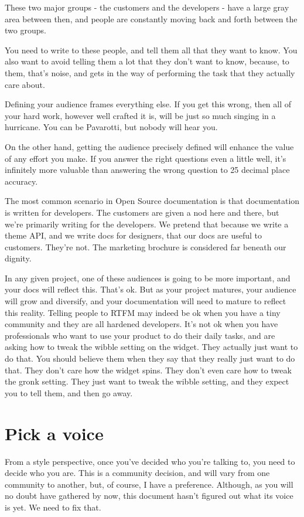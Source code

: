 These two major groups - the customers and the developers - have a large
gray area between then, and people are constantly moving back and forth
between the two groups.

You need to write to these people, and tell them all that they want to
know. You also want to avoid telling them a lot that they don't want to
know, because, to them, that's noise, and gets in the way of performing
the task that they actually care about.

Defining your audience frames everything else. If you get this wrong,
then all of your hard work, however well crafted it is, will be just so
much singing in a hurricane. You can be Pavarotti, but nobody will hear
you.

On the other hand, getting the audience precisely defined will enhance
the value of any effort you make. If you answer the right questions even
a little well, it's infinitely more valuable than answering the wrong
question to 25 decimal place accuracy.

The most common scenario in Open Source documentation is that
documentation is written for developers. The customers are given a nod
here and there, but we're primarily writing for the developers. We
pretend that because we write a theme API, and we write docs for
designers, that our docs are useful to customers. They're not. The
marketing brochure is considered far beneath our dignity.

In any given project, one of these audiences is going to be more
important, and your docs will reflect this. That's ok. But as your
project matures, your audience will grow and diversify, and your
documentation will need to mature to reflect this reality. Telling
people to RTFM may indeed be ok when you have a tiny community and they
are all hardened developers. It's not ok when you have professionals who
want to use your product to do their daily tasks, and are asking how to
tweak the wibble setting on the widget. They actually just want to do
that. You should believe them when they say that they really just want
to do that. They don't care how the widget spins. They don't even care
how to tweak the gronk setting. They just want to tweak the wibble
setting, and they expect you to tell them, and then go away.

\section{Pick a voice}

From a style perspective, once you've decided who you're talking to, you
need to decide who you are. This is a community decision, and will vary
from one community to another, but, of course, I have a preference.
Although, as you will no doubt have gathered by now, this document
hasn't figured out what its voice is yet. We need to fix that.

